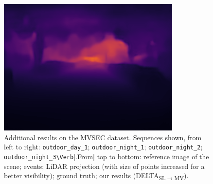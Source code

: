 \begin{figure}
  \includegraphics[width=0.24\linewidth]{mainmatter/figures/c_depth_transf/mvsec_dense_cmp_additional/delta/predbf018188.png}
  \cprotect\caption{Additional results on the MVSEC dataset. Sequences shown, from left to right: \verb|outdoor_day_1|; \verb|outdoor_night_1|; \verb|outdoor_night_2|; \verb|outdoor_night_3\Verb||.From| top to bottom: reference image of the scene; events; LiDAR projection (with size of points increased for a better visibility); ground truth; our results (DELTA\textsubscript{SL\(\rightarrow\)MV}).}\label{fig:appendix:delta:cmp_mvsec_additional}
\end{figure}


